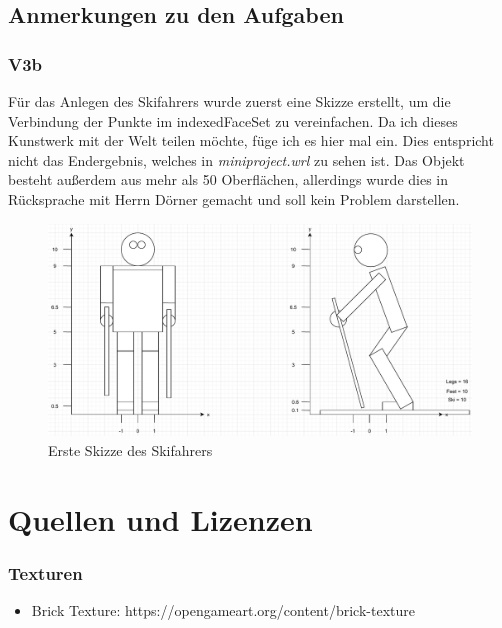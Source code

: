 \documentclass{article}
\begin{document}
\newpage

\subsection*{Anmerkungen zu den Aufgaben}
\subsubsection*{V3b}
Für das Anlegen des Skifahrers wurde zuerst eine Skizze erstellt, um die
Verbindung der Punkte im indexedFaceSet zu vereinfachen. Da ich dieses Kunstwerk
mit der Welt teilen möchte, füge ich es hier mal ein. Dies entspricht nicht das
Endergebnis, welches in \textit{miniproject.wrl} zu sehen ist. Das Objekt besteht
außerdem aus mehr als 50 Oberflächen, allerdings wurde dies in Rücksprache mit
Herrn Dörner gemacht und soll kein Problem darstellen.

\begin{figure}[h]
    \centering
    \includegraphics[scale=0.5]{skifahrer_sketch.pdf}
    \caption{Erste Skizze des Skifahrers}
\end{figure}




\newpage 

\section*{Quellen und Lizenzen}
\subsubsection*{Texturen}
\begin{itemize}
    \item Brick Texture: https://opengameart.org/content/brick-texture
\end{itemize}
\end{document}

